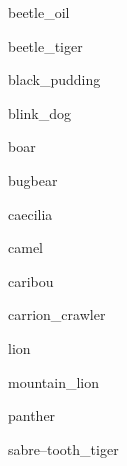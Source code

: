 \documentclass[letterpaper,serif]{module}
\begin{document}
\begin{newmonster}{beetle_oil}\end{newmonster}

\begin{newmonster}{beetle_tiger}\end{newmonster}

\begin{newmonster}{black_pudding}\end{newmonster}

\begin{newmonster}{blink_dog}\end{newmonster}

\begin{newmonster}{boar}\end{newmonster}

\begin{newmonster}{bugbear}\end{newmonster}

\begin{newmonster}{caecilia}\end{newmonster}

\begin{newmonster}{camel}\end{newmonster}

\begin{newmonster}{caribou}\end{newmonster}

\begin{newmonster}{carrion_crawler}\end{newmonster}

\begin{newmonster}{lion}\end{newmonster}

\begin{newmonster}{mountain_lion}\end{newmonster}

\begin{newmonster}{panther}\end{newmonster}

\begin{newmonster}{sabre--tooth_tiger}\end{newmonster}
\end{document}
